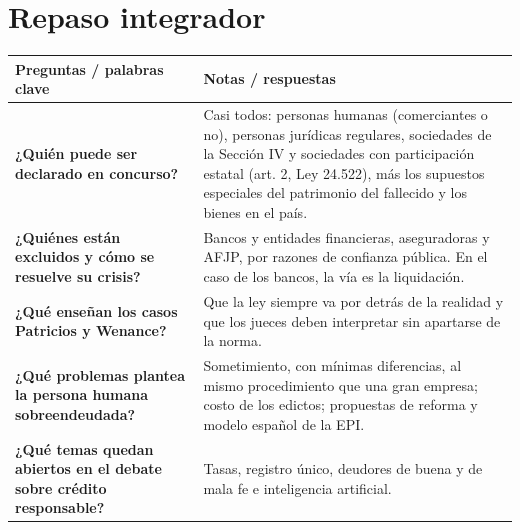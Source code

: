 \documentclass[12pt,oneside]{book}
\begin{document}
\chapter[Repaso integrador]{Repaso integrador}

\begin{longtable}{@{}>{\raggedright\arraybackslash}p{}>{\raggedright\arraybackslash}p{}@{}}
\toprule
\textbf{Preguntas / palabras clave} & \textbf{Notas / respuestas} \\
\midrule
\endhead

\textbf{¿Quién puede ser declarado en concurso?} &
Casi todos: personas humanas (comerciantes o no), personas jurídicas regulares, sociedades de la Sección IV y sociedades con participación estatal (art. 2, Ley 24.522), más los supuestos especiales del patrimonio del fallecido y los bienes en el país. \\
\addlinespace

\textbf{¿Quiénes están excluidos y cómo se resuelve su crisis?} &
Bancos y entidades financieras, aseguradoras y AFJP, por razones de confianza pública. En el caso de los bancos, la vía es la liquidación. \\
\addlinespace

\textbf{¿Qué enseñan los casos Patricios y Wenance?} &
Que la ley siempre va por detrás de la realidad y que los jueces deben interpretar sin apartarse de la norma. \\
\addlinespace

\textbf{¿Qué problemas plantea la persona humana sobreendeudada?} &
Sometimiento, con mínimas diferencias, al mismo procedimiento que una gran empresa; costo de los edictos; propuestas de reforma y modelo español de la EPI. \\
\addlinespace

\textbf{¿Qué temas quedan abiertos en el debate sobre crédito responsable?} &
Tasas, registro único, deudores de buena y de mala fe e inteligencia artificial. \\


\end{longtable}
\end{document}
